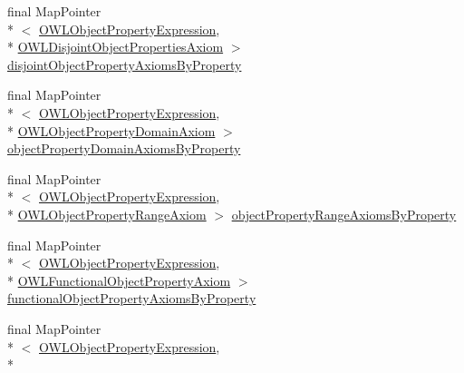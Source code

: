 \begin{DoxyCompactItemize}
\item 
final Map\-Pointer\\*
$<$ \hyperlink{interfaceorg_1_1semanticweb_1_1owlapi_1_1model_1_1_o_w_l_object_property_expression}{O\-W\-L\-Object\-Property\-Expression}, \\*
\hyperlink{interfaceorg_1_1semanticweb_1_1owlapi_1_1model_1_1_o_w_l_disjoint_object_properties_axiom}{O\-W\-L\-Disjoint\-Object\-Properties\-Axiom} $>$ \hyperlink{classuk_1_1ac_1_1manchester_1_1cs_1_1owl_1_1owlapi_1_1_abstract_internals_impl_af301c1193cde0e87759d0bb72c145243}{disjoint\-Object\-Property\-Axioms\-By\-Property}
\item 
final Map\-Pointer\\*
$<$ \hyperlink{interfaceorg_1_1semanticweb_1_1owlapi_1_1model_1_1_o_w_l_object_property_expression}{O\-W\-L\-Object\-Property\-Expression}, \\*
\hyperlink{interfaceorg_1_1semanticweb_1_1owlapi_1_1model_1_1_o_w_l_object_property_domain_axiom}{O\-W\-L\-Object\-Property\-Domain\-Axiom} $>$ \hyperlink{classuk_1_1ac_1_1manchester_1_1cs_1_1owl_1_1owlapi_1_1_abstract_internals_impl_a668859e89951b4e378009626f5b8346c}{object\-Property\-Domain\-Axioms\-By\-Property}
\item 
final Map\-Pointer\\*
$<$ \hyperlink{interfaceorg_1_1semanticweb_1_1owlapi_1_1model_1_1_o_w_l_object_property_expression}{O\-W\-L\-Object\-Property\-Expression}, \\*
\hyperlink{interfaceorg_1_1semanticweb_1_1owlapi_1_1model_1_1_o_w_l_object_property_range_axiom}{O\-W\-L\-Object\-Property\-Range\-Axiom} $>$ \hyperlink{classuk_1_1ac_1_1manchester_1_1cs_1_1owl_1_1owlapi_1_1_abstract_internals_impl_a9efdc4e72374123b825f0dd5eb5cc71f}{object\-Property\-Range\-Axioms\-By\-Property}
\item 
final Map\-Pointer\\*
$<$ \hyperlink{interfaceorg_1_1semanticweb_1_1owlapi_1_1model_1_1_o_w_l_object_property_expression}{O\-W\-L\-Object\-Property\-Expression}, \\*
\hyperlink{interfaceorg_1_1semanticweb_1_1owlapi_1_1model_1_1_o_w_l_functional_object_property_axiom}{O\-W\-L\-Functional\-Object\-Property\-Axiom} $>$ \hyperlink{classuk_1_1ac_1_1manchester_1_1cs_1_1owl_1_1owlapi_1_1_abstract_internals_impl_a05fca5eb6e3121d35d72afda6782ddec}{functional\-Object\-Property\-Axioms\-By\-Property}
\item 
final Map\-Pointer\\*
$<$ \hyperlink{interfaceorg_1_1semanticweb_1_1owlapi_1_1model_1_1_o_w_l_object_property_expression}{O\-W\-L\-Object\-Property\-Expression}, \\*

\end{DoxyCompactItemize}
